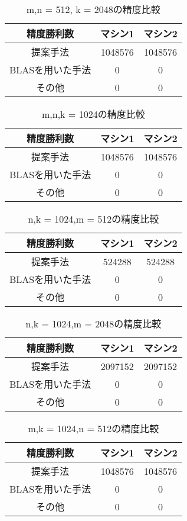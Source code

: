 \documentclass[11pt,a4paper]{jsreport}
\theoremstyle{definition}
\begin{document}
\begin{table}[H]
\centering
\small
\caption{m,n = 512, k = 2048の精度比較}
\begin{tabular}{c|c|c}
\hline
精度勝利数 & マシン1 & マシン2 \\ \hline \hline
提案手法 & 1048576 & 1048576 \\ \hline
BLASを用いた手法 & 0 & 0  \\ \hline
その他 & 0 & 0 \\ \hline
\end{tabular}
\end{table}

\begin{table}[H]
\centering
\small
\caption{m,n,k = 1024の精度比較}
\begin{tabular}{c|c|c}
\hline
精度勝利数 & マシン1 & マシン2 \\ \hline \hline
提案手法 & 1048576 & 1048576 \\ \hline
BLASを用いた手法 & 0 & 0 \\ \hline
その他 & 0 & 0 \\ \hline
\end{tabular}
\end{table}

\begin{table}[H]
\centering
\small
\caption{n,k = 1024,m = 512の精度比較}
\begin{tabular}{c|c|c}
\hline
精度勝利数 & マシン1 & マシン2 \\ \hline \hline
提案手法 & 524288 & 524288 \\ \hline
BLASを用いた手法 & 0 & 0  \\ \hline
その他 & 0 & 0 \\ \hline
\end{tabular}
\end{table}

\begin{table}[H]
\centering
\small
\caption{n,k = 1024,m = 2048の精度比較}
\begin{tabular}{c|c|c}
\hline
精度勝利数 & マシン1 & マシン2 \\ \hline \hline
提案手法 & 2097152 & 2097152 \\ \hline
BLASを用いた手法 & 0 & 0 \\ \hline
その他 & 0 & 0 \\ \hline
\end{tabular}
\end{table}

\begin{table}[H]
\centering
\small
\caption{m,k = 1024,n = 512の精度比較}
\begin{tabular}{c|c|c}
\hline
精度勝利数 & マシン1 & マシン2 \\ \hline \hline
提案手法 & 1048576 & 1048576 \\ \hline
BLASを用いた手法 & 0 & 0 \\ \hline
その他 & 0 & 0 \\ \hline
\end{tabular}
\end{table}
\end{document}
